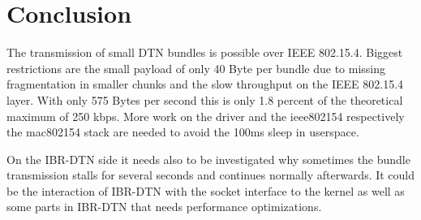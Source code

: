 \chapter{Conclusion}

The transmission of small DTN bundles is possible over IEEE 802.15.4. Biggest
restrictions are the small payload of only 40 Byte per bundle due to missing
fragmentation in smaller chunks and the slow throughput on the IEEE 802.15.4 layer.
With only 575 Bytes per second this is only 1.8 percent of the theoretical
maximum of 250 kbps. More work on the driver and the ieee802154
respectively the mac802154 stack are needed to avoid the 100ms sleep in
userspace.

On the IBR-DTN side it needs also to be investigated why sometimes the bundle
transmission stalls for several seconds and continues normally afterwards. It
could be the interaction of IBR-DTN with the socket interface to the kernel as well
as some parts in IBR-DTN that needs performance optimizations.
